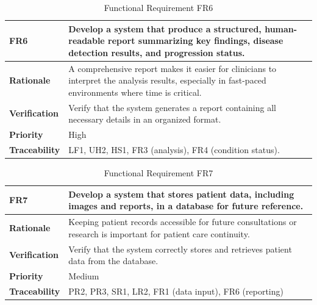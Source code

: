 \documentclass[12pt]{article}
\begin{document}
\begin{table}[h!]
\centering
{}
\begin{tabular}{|p{3.5cm}|p{11.5cm}|}
\hline
\rowcolor{gray!30}
\textbf{FR6} & Develop a system that produce a structured, human-readable report summarizing key findings, disease detection results, and progression status. \\
\hline
\textbf{Rationale} & A comprehensive report makes it easier for clinicians to interpret the analysis results, especially in fast-paced environments where time is critical. \\
\hline
\textbf{Verification} & Verify that the system generates a report containing all necessary details in an organized format. \\
\hline
\textbf{Priority} & High \\
\hline
\textbf{Traceability} &  LF1, UH2, HS1, FR3 (analysis), FR4 (condition status). \\
\hline
\end{tabular}
\caption{Functional Requirement FR6}
\end{table}
\begin{table}[h!]
\centering
{}
\begin{tabular}{|p{3.5cm}|p{11.5cm}|}
\hline
\rowcolor{gray!30}
\textbf{FR7} & Develop a system that stores patient data, including images and reports, in a database for future reference. \\
\hline
\textbf{Rationale} & Keeping patient records accessible for future consultations or research is important for patient care continuity. \\
\hline
\textbf{Verification} & Verify that the system correctly stores and retrieves patient data from the database. \\
\hline
\textbf{Priority} & Medium \\
\hline
\textbf{Traceability} & PR2, PR3, SR1, LR2, FR1 (data input), FR6 (reporting) \\
\hline
\end{tabular}
\caption{Functional Requirement FR7}
\end{table}
\end{document}
